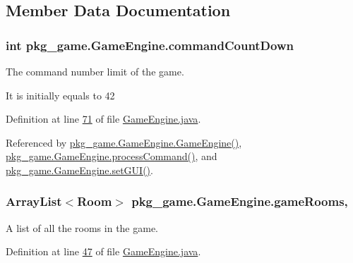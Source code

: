 \subsection{Member Data Documentation}
\hypertarget{classpkg__game_1_1GameEngine_af4ea44f51563b4e2c0a67fe918bf5e3c}{
\subsubsection[{command\-Count\-Down}]{\setlength{\rightskip}{0pt plus 5cm}int pkg\-\_\-game.\-Game\-Engine.\-command\-Count\-Down\hspace{0.3cm}{\ttfamily [private]}}}\label{classpkg__game_1_1GameEngine_af4ea44f51563b4e2c0a67fe918bf5e3c}


The command number limit of the game. 

It is initially equals to 42 

Definition at line \hyperlink{GameEngine_8java_source_l00071}{71} of file \hyperlink{GameEngine_8java_source}{Game\-Engine.\-java}.



Referenced by \hyperlink{GameEngine_8java_source_l00076}{pkg\-\_\-game.\-Game\-Engine.\-Game\-Engine()}, \hyperlink{GameEngine_8java_source_l00238}{pkg\-\_\-game.\-Game\-Engine.\-process\-Command()}, and \hyperlink{GameEngine_8java_source_l00095}{pkg\-\_\-game.\-Game\-Engine.\-set\-G\-U\-I()}.

\hypertarget{classpkg__game_1_1GameEngine_a4b4afca13ceeb1057e50471670bf3306}{
\subsubsection[{game\-Rooms}]{\setlength{\rightskip}{0pt plus 5cm}Array\-List$<${\bf Room}$>$ pkg\-\_\-game.\-Game\-Engine.\-game\-Rooms\hspace{0.3cm}{\ttfamily [static]}, {\ttfamily [private]}}}\label{classpkg__game_1_1GameEngine_a4b4afca13ceeb1057e50471670bf3306}


A list of all the rooms in the game. 



Definition at line \hyperlink{GameEngine_8java_source_l00047}{47} of file \hyperlink{GameEngine_8java_source}{Game\-Engine.\-java}.



